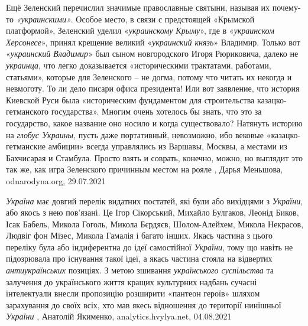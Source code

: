 Ещё Зеленский перечислил значимые православные святыни, называя их почему-то
\emph{«украинскими»}. Особое место, в связи с предстоящей «Крымской
платформой», Зеленский уделил «\emph{украинскому Крыму}», где в
«\emph{украинском Херсонесе}», принял крещение великий «\emph{украинский
князь}» Владимир. Только вот «\emph{украинский Владимир}» был сыном
новгородского Игоря Рюриковича, далеко не \emph{украинца}, что легко
доказывается «историческими трактатами, работами, статьями», которые для
Зеленского – не догма, потому что читать их некогда и невмоготу. То ли дело
писари офиса президента!  Или вот заявление, что история Киевской Руси была
«историческим фундаментом для строительства казацко-гетманского государства».
Многим очень хотелось бы знать, что это за государство, какое название оно
носило и когда существовало?  Натянуть историю на \emph{глобус Украины}, пусть
даже портативный, невозможно, ибо вековые «казацко-гетманские амбиции» всегда
управлялись из Варшавы, Москвы, а местами из Бахчисарая и Стамбула. Просто
взять и соврать, конечно, можно, но выглядит это так же, как игра Зеленского
причинным местом на рояле
, 
Дарья Меньшова, odnarodyna.org, 29.07.2021

\emph{Україна} має довгий перелік видатних постатей, які були або вихідцями з \emph{України},
або якось з нею пов’язані. Це Ігор Сікорський, Михайло Булгаков, Леонід Биков,
Ісак Бабель, Микола Гоголь, Микола Бєрдяєв, Шолом-Алейхем, Микола Некрасов,
Людвіг фон Мізес, Микола Гамалія і багато інших. Якась частина з цього переліку
була або індиферентна до ідеї самостійної \emph{України}, тому що навіть не
підозрювала про існування такої ідеї, а якась частина стояла на відвертих
\emph{антиукраїнських} позиціях.
З метою зшивання \emph{українського суспільства} та залучення до українського життя
кращих культурних надбань сучасні інтелектуали внесли пропозицію розширити
«пантеон героїв» шляхом зарахування до своїх всіх, хто мав якесь відношення до
території нинішньої \emph{України}
, 
Анатолій Якименко, analytics.hvylya.net, 04.08.2021
